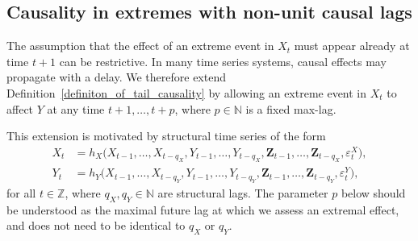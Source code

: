 \documentclass[a4paper,11pt]{article}
\begin{document}
\subsection{Causality in extremes with non-unit causal lags}
\label{Appendix_A_lag_greater_than_1}

The assumption that the effect of an extreme event in \(X_t\) must appear already at
time \(t+1\) can be restrictive. In many time series systems, causal effects may propagate
with a delay. We therefore extend Definition~\ref{definiton_of_tail_causality} by allowing
an extreme event in \(X_t\) to affect \(Y\) at any time \(t+1,\ldots,t+p\), where
\(p\in\mathbb N\) is a fixed max-lag.

This extension is motivated by structural time series of the form
\begin{equation}\label{structural_generation_lagged}
\begin{split}
    X_t
    &=h_{X}\big(
        X_{t-1},\dots,X_{t-q_X},
        Y_{t-1},\dots,Y_{t-q_X},
        \mathbf Z_{t-1},\dots,\mathbf Z_{t-q_X},
        \varepsilon^X_t
    \big),\\
    Y_t
    &=h_{Y}\big(
        X_{t-1},\dots,X_{t-q_Y},
        Y_{t-1},\dots,Y_{t-q_Y},
        \mathbf Z_{t-1},\dots,\mathbf Z_{t-q_Y},
        \varepsilon^Y_t
    \big),
\end{split}
\end{equation}
for all \(t\in\mathbb Z\), where \(q_X,q_Y\in\mathbb N\) are structural lags. The
parameter \(p\) below should be understood as the maximal future lag at which we assess
an extremal effect, and does not need to be identical to \(q_X\) or \(q_Y\).
\end{document}
